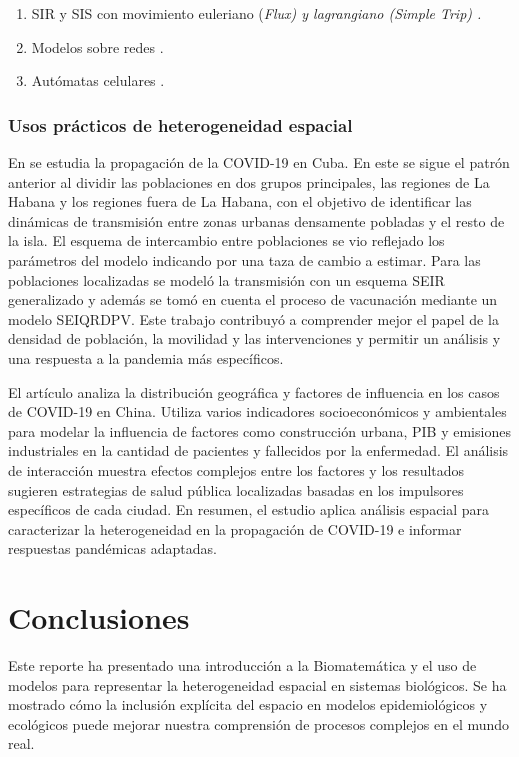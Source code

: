 \documentclass[fleqn,10pt]{SelfArx_063318} %
\begin{document}
\begin{enumerate}
    \item SIR y SIS con movimiento euleriano (\it{Flux}) y lagrangiano (\it{Simple Trip}) \cite{citron2021comparing}.
    \item Modelos sobre redes \cite{mishra2017network}.
    \item Autómatas celulares \cite{medeiros2011modeling}.
\end{enumerate}

\subsubsection{Usos prácticos de heterogeneidad espacial}

En \cite{guinovart2021multi} se estudia la propagación de la COVID-19 en Cuba. En este se sigue el patrón anterior al 
dividir las poblaciones en dos grupos principales,
las regiones de La Habana y los regiones fuera de La Habana, con el objetivo de identificar las dinámicas de 
transmisión entre zonas urbanas densamente pobladas y el resto de la isla. El esquema de intercambio entre poblaciones 
se vio reflejado los parámetros del modelo indicando por una taza de cambio a estimar. Para las poblaciones localizadas
se modeló la transmisión con un esquema SEIR generalizado y además se tomó en cuenta el proceso de vacunación mediante
un modelo SEIQRDPV. Este trabajo contribuyó a comprender mejor el papel de la densidad de población, la movilidad y las 
intervenciones y permitir un análisis y una respuesta a la pandemia más específicos.

El artículo \cite{li2022geographical} analiza la distribución geográfica y factores de influencia en los casos de 
COVID-19 en China. Utiliza varios indicadores socioeconómicos y ambientales para modelar la 
influencia de factores como construcción urbana, PIB y emisiones industriales en la cantidad de pacientes y fallecidos
por la enfermedad. El análisis de interacción muestra efectos complejos entre los factores y los resultados sugieren 
estrategias de salud pública localizadas basadas en los impulsores específicos de cada ciudad. 
En resumen, el estudio aplica análisis espacial para caracterizar la heterogeneidad en la propagación de COVID-19 e 
informar respuestas pandémicas adaptadas.

\section{Conclusiones}
Este reporte ha presentado una introducción a la Biomatemática y el uso de modelos para representar la 
heterogeneidad espacial en sistemas biológicos. Se ha mostrado cómo la inclusión explícita del espacio en 
modelos epidemiológicos y ecológicos puede mejorar nuestra comprensión de procesos complejos en el mundo real.
\end{document}
